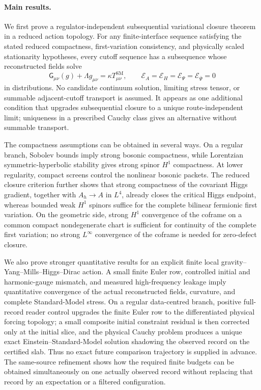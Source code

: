 \documentclass[11pt]{article}
\numberwithin{equation}{section}
\theoremstyle{definition}
\theoremstyle{remark}
\newcommand{\Eins}{\mathsf G}
\newcommand{\Evar}{\mathcal E}
\newcommand{\bPsi}{\overline\Psi}
\begin{document}
\paragraph{Main results.}

We first prove a regulator-independent subsequential variational closure
theorem in a reduced action topology.  For any finite-interface sequence satisfying the stated reduced compactness,
first-variation consistency, and physically scaled stationarity hypotheses,
every cutoff sequence has a subsequence whose reconstructed fields solve
\begin{equation}
\Eins_{\mu\nu}(g)+\Lambda g_{\mu\nu}
=
\kappa T^{\mathrm{SM}}_{\mu\nu},
\qquad
\Evar_A=\Evar_H=\Evar_\Psi=\Evar_{\bPsi}=0
\label{eq:intro-ESM-system-new}
\end{equation}
in distributions.  No candidate continuum solution, limiting stress tensor,
or summable adjacent-cutoff transport is assumed.  It appears as
one additional condition that upgrades subsequential closure to a unique
route-independent limit; uniqueness in a prescribed Cauchy class gives an
alternative without summable transport.

The compactness assumptions can be obtained in several ways.  On a regular
branch, Sobolev bounds imply strong bosonic compactness, while Lorentzian
symmetric-hyperbolic stability gives strong spinor $H^1$ compactness.  At
lower regularity, compact screens control the nonlinear bosonic packets.
The reduced closure criterion further shows that strong compactness of the
covariant Higgs gradient, together with $A_h\to A$ in $L^4$, already closes
the critical Higgs endpoint, whereas bounded weak $H^1$ spinors suffice for
the complete bilinear fermionic first variation.  On the geometric side,
strong $H^1$ convergence of the coframe on a common compact nondegenerate
chart is sufficient for continuity of the complete first variation; no
strong $L^\infty$ convergence of the coframe is needed for zero-defect closure.

We also prove stronger quantitative results for an explicit finite local
gravity--Yang--Mills--Higgs--Dirac action.  A small finite Euler row,
controlled initial and harmonic-gauge mismatch, and measured high-frequency
leakage imply quantitative convergence of the actual reconstructed fields,
curvature, and complete Standard-Model stress.  On a regular data-centred
branch, positive full-record reader control upgrades the finite Euler row to
the differentiated physical forcing topology; a small composite initial
constraint residual is then corrected only at the initial slice, and the
physical Cauchy problem produces a unique exact Einstein--Standard-Model
solution shadowing the observed record on the certified slab.  Thus no exact
future comparison trajectory is supplied in advance.  The same-source
refinement shows how the required finite budgets can be obtained
simultaneously on one actually observed record without replacing that record
by an expectation or a filtered configuration.
\end{document}
